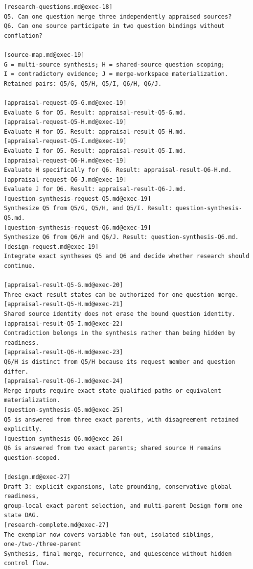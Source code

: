 \documentclass[11pt]{article}
\begin{document}
\begin{lstlisting}[style=playbook,basicstyle=\ttfamily\scriptsize]
[research-questions.md@exec-18]
Q5. Can one question merge three independently appraised sources?
Q6. Can one source participate in two question bindings without conflation?

[source-map.md@exec-19]
G = multi-source synthesis; H = shared-source question scoping;
I = contradictory evidence; J = merge-workspace materialization.
Retained pairs: Q5/G, Q5/H, Q5/I, Q6/H, Q6/J.

[appraisal-request-Q5-G.md@exec-19]
Evaluate G for Q5. Result: appraisal-result-Q5-G.md.
[appraisal-request-Q5-H.md@exec-19]
Evaluate H for Q5. Result: appraisal-result-Q5-H.md.
[appraisal-request-Q5-I.md@exec-19]
Evaluate I for Q5. Result: appraisal-result-Q5-I.md.
[appraisal-request-Q6-H.md@exec-19]
Evaluate H specifically for Q6. Result: appraisal-result-Q6-H.md.
[appraisal-request-Q6-J.md@exec-19]
Evaluate J for Q6. Result: appraisal-result-Q6-J.md.
[question-synthesis-request-Q5.md@exec-19]
Synthesize Q5 from Q5/G, Q5/H, and Q5/I. Result: question-synthesis-Q5.md.
[question-synthesis-request-Q6.md@exec-19]
Synthesize Q6 from Q6/H and Q6/J. Result: question-synthesis-Q6.md.
[design-request.md@exec-19]
Integrate exact syntheses Q5 and Q6 and decide whether research should continue.

[appraisal-result-Q5-G.md@exec-20]
Three exact result states can be authorized for one question merge.
[appraisal-result-Q5-H.md@exec-21]
Shared source identity does not erase the bound question identity.
[appraisal-result-Q5-I.md@exec-22]
Contradiction belongs in the synthesis rather than being hidden by readiness.
[appraisal-result-Q6-H.md@exec-23]
Q6/H is distinct from Q5/H because its request member and question differ.
[appraisal-result-Q6-J.md@exec-24]
Merge inputs require exact state-qualified paths or equivalent materialization.
[question-synthesis-Q5.md@exec-25]
Q5 is answered from three exact parents, with disagreement retained explicitly.
[question-synthesis-Q6.md@exec-26]
Q6 is answered from two exact parents; shared source H remains question-scoped.

[design.md@exec-27]
Draft 3: explicit expansions, late grounding, conservative global readiness,
group-local exact parent selection, and multi-parent Design form one state DAG.
[research-complete.md@exec-27]
The exemplar now covers variable fan-out, isolated siblings, one-/two-/three-parent
Synthesis, final merge, recurrence, and quiescence without hidden control flow.
\end{lstlisting}
\end{document}
